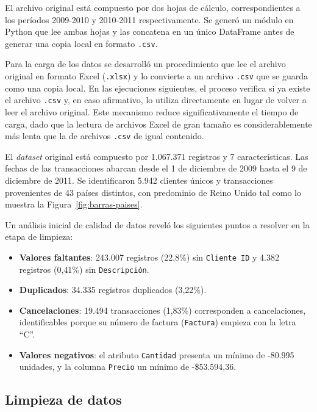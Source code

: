 \documentclass[a4paper,10pts,openany]{book}
\begin{document}
	El archivo original está compuesto por dos hojas de cálculo, correspondientes a los períodos 2009-2010 y 2010-2011 respectivamente. Se generó un módulo en Python que lee ambas hojas y las concatena en un único DataFrame antes de generar una copia local en formato \texttt{.csv}.
	
	Para la carga de los datos se desarrolló un procedimiento que lee el archivo original en formato Excel (\texttt{.xlsx}) y lo convierte a un archivo \texttt{.csv} que se guarda como una copia local. En las ejecuciones siguientes, el proceso verifica si ya existe el archivo \texttt{.csv} y, en caso afirmativo, lo utiliza directamente en lugar de volver a leer el archivo original. Este mecanismo reduce significativamente el tiempo de carga, dado que la lectura de archivos Excel de gran tamaño es considerablemente más lenta que la de archivos \texttt{.csv} de igual contenido.
	
	El \emph{dataset} original está compuesto por 1.067.371 registros y 7 características. Las fechas de las transacciones abarcan desde el 1 de diciembre de 2009 hasta el 9 de diciembre de 2011. Se identificaron 5.942 clientes únicos y transacciones provenientes de 43 países distintos, con predominio de Reino Unido tal como lo muestra la Figura~\ref{fig:barras-paises}.
	
	Un análisis inicial de calidad de datos reveló los siguientes puntos a resolver en la etapa de limpieza:
	
	
	\begin{itemize}
		\item \textbf{Valores faltantes}: 243.007 registros (22{,}8\%) sin \texttt{Cliente ID} y 4.382 registros (0{,}41\%) sin \texttt{Descripción}.
		\item \textbf{Duplicados}: 34.335 registros duplicados (3{,}22\%).
		\item \textbf{Cancelaciones}: 19.494 transacciones (1{,}83\%) corresponden a cancelaciones, identificables porque su número de factura (\texttt{Factura}) empieza con la letra ``C''.
		\item \textbf{Valores negativos}: el atributo \texttt{Cantidad} presenta un mínimo de -80.995 unidades, y la columna \texttt{Precio} un mínimo de -\$53.594{,}36.
	\end{itemize}
	
	\subsection{Limpieza de datos}
	
\end{document}
